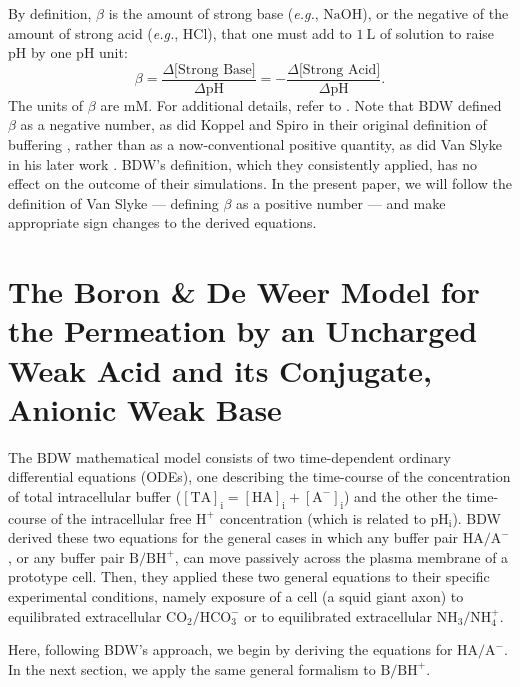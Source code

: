 \documentclass[fleqn,10pt]{physiome}
\begin{document}
By definition, $\beta$ is the amount of strong base (\emph{e.g.}, $\mathrm{NaOH}$), or the negative of the amount of strong acid (\emph{e.g.}, $\mathrm{HCl}$), that one must add to $1~\mathrm{L}$ of solution to raise $\mathrm{pH}$ by one $\mathrm{pH}$ unit:
\begin{equation}
\beta=\dfrac{\Delta\text{[Strong~Base]}}{\Delta \mathrm{pH}}=-\dfrac{\Delta\text{[Strong~Acid]}}{\Delta \mathrm{pH}}.
\label{eqn:buffer}
\end{equation}
The units of $\beta$ are $\mathrm{mM}$. For additional details, refer to \cite{roos1981intracellular,boron2016medical}. Note that BDW defined $\beta$ as a negative number, as did Koppel and Spiro in their original definition of buffering \citep{koppel1914wirkung,roos1980buffer}, rather than as a now-conventional positive quantity, as did Van Slyke in his later work \citep{van1922measurement}. BDW's definition, which they consistently applied, has no effect on the outcome of their simulations. In the present paper, we will follow the definition of Van Slyke --- defining $\beta$ as a positive number --- and make appropriate sign changes to the derived equations.

\section{The Boron \& De Weer Model for the Permeation by an Uncharged Weak Acid and its Conjugate, Anionic Weak Base}

The BDW mathematical model consists of two time-dependent ordinary differential equations (ODEs), one describing the time-course of the concentration of total intracellular buffer ($\mathrm{[TA]_i} = \mathrm{[HA]_i}+\mathrm{[A^-]_i}$) and the other the time-course of the intracellular free $\mathrm{H^+}$ concentration (which is related to $\mathrm{pH_i}$). BDW derived these two equations for the general cases in which any buffer pair $\mathrm{HA}/\mathrm{A^-}$, or any buffer pair $\mathrm{B}/\mathrm{BH^+}$, can move passively across the plasma membrane of a prototype cell. Then, they applied these two general equations to their specific experimental conditions, namely exposure of a cell (a squid giant axon) to equilibrated extracellular $\mathrm{CO_2}/\mathrm{HCO_3^-}$ or to equilibrated extracellular $\mathrm{NH_3}/\mathrm{NH_4^+}$.

Here, following BDW's approach, we begin by deriving the equations for $\mathrm{HA}/\mathrm{A^-}$. In the next section, we apply the same general formalism to $\mathrm{B}/\mathrm{BH^+}$.
\end{document}
